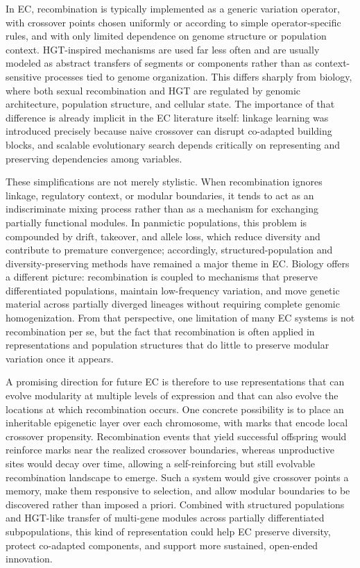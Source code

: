 In EC, recombination is typically implemented as a generic variation operator, with crossover points chosen uniformly or according to simple operator-specific rules, and with only limited dependence on genome structure or population context.
HGT-inspired mechanisms are used far less often and are usually modeled as abstract transfers of segments or components rather than as context-sensitive processes tied to genome organization.
This differs sharply from biology, where both sexual recombination and HGT are regulated by genomic architecture, population structure, and cellular state.
The importance of that difference is already implicit in the EC literature itself: linkage learning was introduced precisely because naive crossover can disrupt co-adapted building blocks, and scalable evolutionary search depends critically on representing and preserving dependencies among variables.

These simplifications are not merely stylistic.
When recombination ignores linkage, regulatory context, or modular boundaries, it tends to act as an indiscriminate mixing process rather than as a mechanism for exchanging partially functional modules.
In panmictic populations, this problem is compounded by drift, takeover, and allele loss, which reduce diversity and contribute to premature convergence; accordingly, structured-population and diversity-preserving methods have remained a major theme in EC.
Biology offers a different picture: recombination is coupled to mechanisms that preserve differentiated populations, maintain low-frequency variation, and move genetic material across partially diverged lineages without requiring complete genomic homogenization.
From that perspective, one limitation of many EC systems is not recombination per se, but the fact that recombination is often applied in representations and population structures that do little to preserve modular variation once it appears.

A promising direction for future EC is therefore to use representations that can evolve modularity at multiple levels of expression and that can also evolve the locations at which recombination occurs.
One concrete possibility is to place an inheritable epigenetic layer over each chromosome, with marks that encode local crossover propensity.
Recombination events that yield successful offspring would reinforce marks near the realized crossover boundaries, whereas unproductive sites would decay over time, allowing a self-reinforcing but still evolvable recombination landscape to emerge.
Such a system would give crossover points a memory, make them responsive to selection, and allow modular boundaries to be discovered rather than imposed a priori.
Combined with structured populations and HGT-like transfer of multi-gene modules across partially differentiated subpopulations, this kind of representation could help EC preserve diversity, protect co-adapted components, and support more sustained, open-ended innovation.


